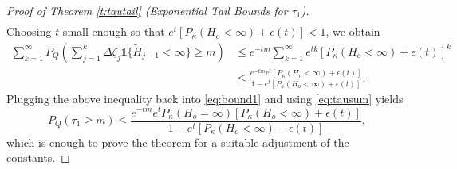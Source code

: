 \documentclass[a4paper]{amsart}
\newcommand{\hitfetak}{\widetilde{H}}
\begin{document}
\begin{proof}[Proof of Theorem \ref{t:tautail} (Exponential Tail Bounds for $\tau_1$)]
\begin{equation}
\begin{split}
    \end{split}
\end{equation}
Choosing $t$ small enough so that $e^{t}\left[P_\kappa(H_o < \infty) + \epsilon(t)\right] < 1$, we obtain 
\begin{equation}
    \begin{split}
    \sum_{k=1}^\infty P_Q\left( \sum_{j=1}^{k}\Delta \zeta_j \mathds{1}\{\hitfetak_{j-1} < \infty \}\ge  m\right) & \le e^{-tm}\sum_{k=1}^\infty e^{tk}\left[P_\kappa(H_o < \infty) + \epsilon(t)\right]^k\\
    & \le \frac{e^{-tm}e^{t}\left[P_\kappa(H_o < \infty) + \epsilon(t)\right]}{1-e^{t}\left[P_\kappa(H_o < \infty) + \epsilon(t)\right]}.
    \end{split}
\end{equation}
Plugging the above inequality back into \eqref{eq:bound1} and using \eqref{eq:tausum} yields
$$
P_Q(\tau_1 \ge m) \le \frac{e^{-tm}e^{t}P_\kappa(H_o = \infty)\left[P_\kappa(H_o < \infty) + \epsilon(t)\right]}{1-e^{t}\left[P_\kappa(H_o < \infty) + \epsilon(t)\right]},
$$
which is enough to prove the theorem for a suitable adjustment of the constants.
\end{proof}
\end{document}
